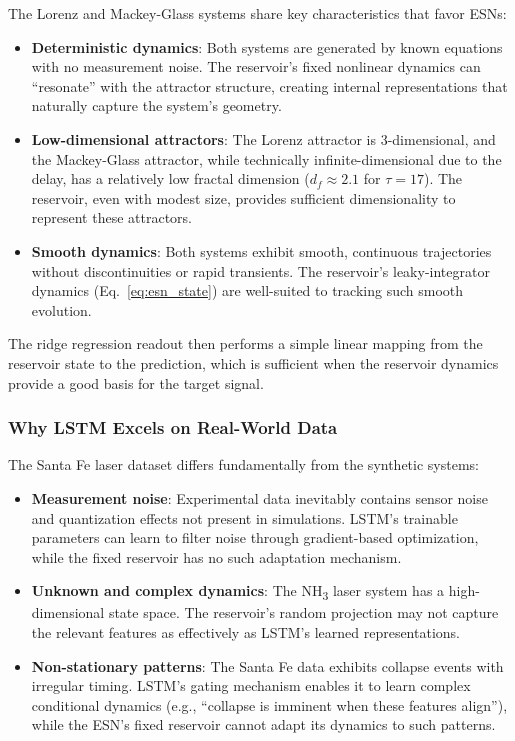 The Lorenz and Mackey-Glass systems share key characteristics that favor ESNs:
\begin{itemize}
    \item \textbf{Deterministic dynamics}: Both systems are generated by known equations with no measurement noise. The reservoir's fixed nonlinear dynamics can ``resonate'' with the attractor structure, creating internal representations that naturally capture the system's geometry.
    \item \textbf{Low-dimensional attractors}: The Lorenz attractor is 3-dimensional, and the Mackey-Glass attractor, while technically infinite-dimensional due to the delay, has a relatively low fractal dimension ($d_f \approx 2.1$ for $\tau = 17$). The reservoir, even with modest size, provides sufficient dimensionality to represent these attractors.
    \item \textbf{Smooth dynamics}: Both systems exhibit smooth, continuous trajectories without discontinuities or rapid transients. The reservoir's leaky-integrator dynamics (Eq.~\ref{eq:esn_state}) are well-suited to tracking such smooth evolution.
\end{itemize}

The ridge regression readout then performs a simple linear mapping from the reservoir state to the prediction, which is sufficient when the reservoir dynamics provide a good basis for the target signal.

\subsubsection{Why LSTM Excels on Real-World Data}

The Santa Fe laser dataset differs fundamentally from the synthetic systems:
\begin{itemize}
    \item \textbf{Measurement noise}: Experimental data inevitably contains sensor noise and quantization effects not present in simulations. LSTM's trainable parameters can learn to filter noise through gradient-based optimization, while the fixed reservoir has no such adaptation mechanism.
    \item \textbf{Unknown and complex dynamics}: The NH\textsubscript{3} laser system has a high-dimensional state space. The reservoir's random projection may not capture the relevant features as effectively as LSTM's learned representations.
    \item \textbf{Non-stationary patterns}: The Santa Fe data exhibits collapse events with irregular timing. LSTM's gating mechanism enables it to learn complex conditional dynamics (e.g., ``collapse is imminent when these features align''), while the ESN's fixed reservoir cannot adapt its dynamics to such patterns.
\end{itemize}

